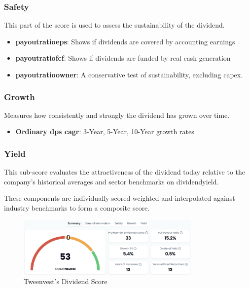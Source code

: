 \documentclass[11pt,english,a4paper,hidelinks]{book}
\begin{document}
\subsubsection{Safety}
This part of the score is used to assess the sustainability of the dividend.
\begin{itemize}
    \item \textbf{\acrshort{payoutratioeps}}: Shows if dividends are covered by accounting earnings
    \item \textbf{\acrshort{payoutratiofcf}}: Shows if dividends are funded by real cash generation
    \item \textbf{\acrshort{payoutratioowner}}: A conservative test of sustainability, excluding \acrshort{capex}.
\end{itemize}

\subsubsection{Growth}
\noindent Measures how consistently and strongly the dividend has grown over time.
\begin{itemize}
    \item \textbf{Ordinary \acrshort{dps} \acrshort{cagr}}: 3-Year, 5-Year, 10-Year growth rates
\end{itemize}

\subsubsection{Yield}
\noindent This sub-score evaluates the attractiveness of the dividend today relative to the company's historical averages and sector benchmarks on \acrshort{dividendyield}.

\vspace{0.5cm}
\noindent These components are individually scored weighted and interpolated against industry benchmarks to form a composite score. 

\begin{figure}[H]
    \centering
    \includegraphics[width=0.8\textwidth]{images/tweenvest/dividend score.png}
    \caption{Tweenvest's Dividend Score}
    \label{fig:dividend_score}
\end{figure}
\end{document}
